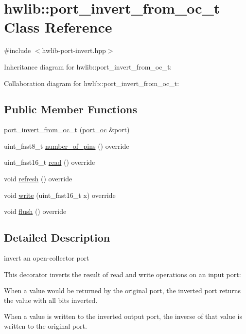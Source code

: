 \hypertarget{classhwlib_1_1port__invert__from__oc__t}{}\section{hwlib\+:\+:port\+\_\+invert\+\_\+from\+\_\+oc\+\_\+t Class Reference}
\label{classhwlib_1_1port__invert__from__oc__t}


{\ttfamily \#include $<$hwlib-\/port-\/invert.\+hpp$>$}



Inheritance diagram for hwlib\+:\+:port\+\_\+invert\+\_\+from\+\_\+oc\+\_\+t\+:


Collaboration diagram for hwlib\+:\+:port\+\_\+invert\+\_\+from\+\_\+oc\+\_\+t\+:
\subsection*{Public Member Functions}
\begin{DoxyCompactItemize}
\item 
\hyperlink{classhwlib_1_1port__invert__from__oc__t_a7d3d2c2353f3cb4f1b1805a4bdcfd519}{port\+\_\+invert\+\_\+from\+\_\+oc\+\_\+t} (\hyperlink{classhwlib_1_1port__oc}{port\+\_\+oc} \&port)
\item 
uint\+\_\+fast8\+\_\+t \hyperlink{classhwlib_1_1port__invert__from__oc__t_aebb0d0486a6a31d075ee9e4467f3a7f6}{number\+\_\+of\+\_\+pins} () override
\item 
uint\+\_\+fast16\+\_\+t \hyperlink{classhwlib_1_1port__invert__from__oc__t_ab2ad571f994e23b53f86e9655541b10d}{read} () override
\item 
void \hyperlink{classhwlib_1_1port__invert__from__oc__t_a72a8110fbfc6115c279e9340869420d7}{refresh} () override
\item 
void \hyperlink{classhwlib_1_1port__invert__from__oc__t_a7c59288ec311931116f47f88dfd1d1f0}{write} (uint\+\_\+fast16\+\_\+t x) override
\item 
void \hyperlink{classhwlib_1_1port__invert__from__oc__t_af2b0e060990d5c507bd0b796d84a8777}{flush} () override
\end{DoxyCompactItemize}


\subsection{Detailed Description}
invert an open-\/collector port

This decorator inverts the result of read and write operations on an input port\+:
\begin{DoxyItemize}
\item When a value would be returned by the original port, the inverted port returns the value with all bits inverted.
\item When a value is written to the inverted output port, the inverse of that value is written to the original port. 
\end{DoxyItemize}

